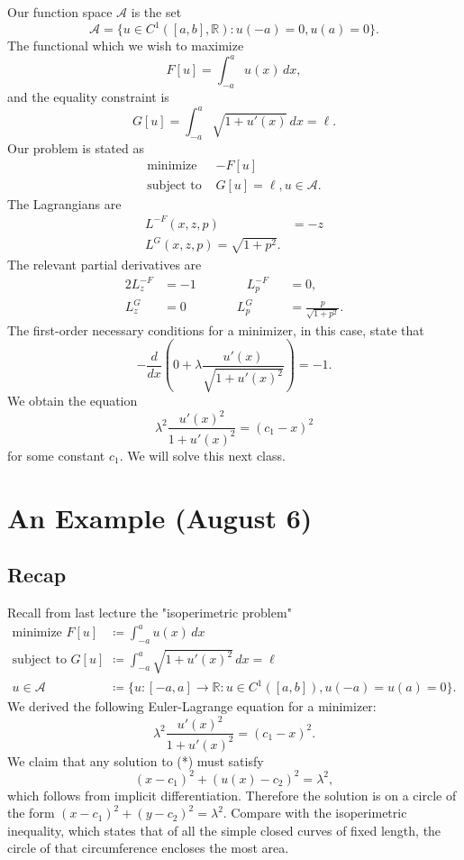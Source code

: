 \documentclass[11pt]{article}
\newcommand{\R}{\mathbb{R}}
\begin{document}
Our function space $\mathcal{A}$ is the set
\[
\mathcal{A} = \{ u \in C^1([a,b], \R) : u(-a) = 0, u(a) = 0 \}.
\]
The functional which we wish to maximize
\[
F[u] = \int_{-a}^a u(x) \, dx,
\]
and the equality constraint is
\[
G[u] = \int_{-a}^a \sqrt{1 + u'(x)} \, dx = \ell.
\]
Our problem is stated as
\begin{align*}
\text{minimize } &-F[u] \\
\text{subject to } & G[u] = \ell, u \in \mathcal{A}.
\end{align*}
The Lagrangians are
\begin{align*}
L^{-F}(x,z,p) &= -z \\
L^G(x,z,p) = \sqrt{1 + p^2}.
\end{align*}
The relevant partial derivatives are
\begin{alignat*}{2}
L^{-F}_z &= -1 \qquad\qquad L^{-F}_p &&= 0, \\
L^G_z &= 0 \qquad\qquad L^G_p &&= \frac{p}{\sqrt{1 + p^2}}.
\end{alignat*}
The first-order necessary conditions for a minimizer, in this case, state that
\[
-\frac{d}{dx} \left( 0 + \lambda \frac{u'(x)}{\sqrt{1 + u'(x)^2}} \right) = -1.
\]
We obtain the equation
\[
\lambda^2 \frac{u'(x)^2}{1 + u'(x)^2} = (c_1 - x)^2
\]
for some constant $c_1$. We will solve this next class.

\newpage

\section{An Example (August 6)}

\subsection{Recap}

Recall from last lecture the "isoperimetric problem"
\begin{align*}
\text{minimize } F[u] &\coloneqq \int_{-a}^a u(x) \, dx \\
\text{subject to } G[u] &\coloneqq \int_{-a}^a \sqrt{1 + u'(x)^2} \, dx = \ell \\
u \in \mathcal{A} &\coloneqq \{ u : [-a, a] \to \R : u \in C^1([a,b]), u(-a) = u(a) = 0 \}.
\end{align*}
We derived the following Euler-Lagrange equation for a minimizer:
\[
\tag{*}
\lambda^2 \frac{u'(x)^2}{1 + u'(x)^2} = (c_1 - x)^2.
\]
We claim that any solution to (*) must satisfy
\[
(x - c_1)^2 + (u(x) - c_2)^2 = \lambda^2,
\]
which follows from implicit differentiation. Therefore the solution is on a circle of the form $(x - c_1)^2 + (y - c_2)^2 = \lambda^2$. Compare with the isoperimetric inequality, which states that of all the simple closed curves of fixed length, the circle of that circumference encloses the most area.
\end{document}

